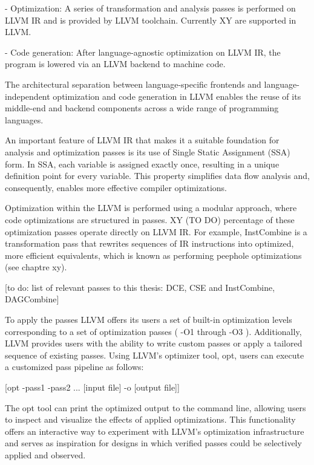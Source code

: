 - Optimization: A series of transformation and analysis passes is performed on LLVM IR and is provided by LLVM toolchain. Currently XY are supported in LLVM.

- Code generation: After language-agnostic optimization on LLVM IR, the program is lowered via an LLVM backend to machine code.

The architectural separation between language-specific frontends and language-independent optimization and code generation in LLVM enables the reuse of its middle-end and backend components across a wide range of programming languages. 

An important feature of LLVM IR that makes it a suitable foundation for analysis and optimization passes is its use of Single Static Assignment (SSA) form. In SSA, each variable is assigned exactly once, resulting in a unique definition point for every variable. This property simplifies data flow analysis and, consequently, enables more effective compiler optimizations.

Optimization within the LLVM is performed using a modular approach, where code optimizations are structured in passes.
 XY (TO DO) percentage of these optimization passes operate directly on LLVM IR. For example, InstCombine is a transformation pass that rewrites sequences of IR instructions into optimized, more efficient equivalents, which is known as performing peephole optimizations (see chaptre xy).

 [to do: list of relevant passes to this thesis:
  DCE, CSE and InstCombine, DAGCombine]

To apply the passes LLVM offers its users a set of built-in optimization levels corresponding to a set of optimization passes ( -O1 through -O3 ). Additionally, LLVM provides users with the ability to write custom passes or apply a tailored sequence of existing passes. Using LLVM’s optimizer tool, opt, users can execute a customized pass pipeline as follows:

[opt -pass1 -pass2 ... [input file] -o [output file]]

The opt tool can print the optimized output to the command line, allowing users to inspect and visualize the effects of applied optimizations. This functionality offers an interactive way to experiment with LLVM’s optimization infrastructure and serves as inspiration for designs in which verified passes could be selectively applied and observed.

